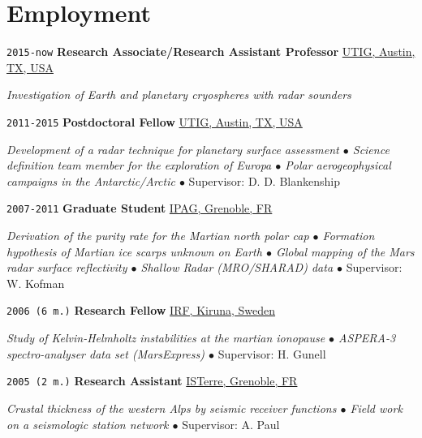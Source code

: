 
\section*{Employment}

\TabPositions{7em,32em}

\noindent \texttt{2015-now} \tab \textbf{Research Associate/Research Assistant Professor} \tab
\href{https://www.ig.utexas.edu/}{UTIG, Austin, TX, USA}
\begin{adjustwidth}{7em}{}
\textit{Investigation of Earth and planetary cryospheres with radar sounders}
\end{adjustwidth}
\vspace{.5em}

\noindent \texttt{2011-2015} \tab \textbf{Postdoctoral Fellow} \tab
\href{https://www.ig.utexas.edu/}{UTIG, Austin, TX, USA}
\begin{adjustwidth}{7em}{}
\textit{Development of a radar technique for planetary surface assessment $\bullet$ Science definition team member for the exploration of Europa $\bullet$ Polar aerogeophysical campaigns in the Antarctic/Arctic $\bullet$} Supervisor: D. D. Blankenship
\end{adjustwidth}
\vspace{.5em}

\noindent \texttt{2007-2011} \tab \textbf{Graduate Student} \tab
\href{http://ipag.osug.fr/}{IPAG, Grenoble, FR}
\vspace{.3em}
\begin{adjustwidth}{7em}{}
\textit{Derivation of the purity rate for the Martian north polar cap $\bullet$ Formation hypothesis of Martian ice scarps unknown on Earth $\bullet$ Global mapping of the Mars radar surface reflectivity $\bullet$ Shallow Radar (MRO/SHARAD) data $\bullet$} Supervisor: W. Kofman
\end{adjustwidth}
\vspace{.5em}

\noindent \texttt{2006 (6 m.)} \tab \textbf{Research Fellow} \tab
\href{https://www2.irf.se/}{IRF, Kiruna, Sweden}
\vspace{.3em}
\begin{adjustwidth}{7em}{}
\textit{Study of Kelvin-Helmholtz instabilities at the martian ionopause $\bullet$ ASPERA-3 spectro-analyser data set (MarsExpress) $\bullet$} Supervisor: H. Gunell
\end{adjustwidth}
\vspace{.5em}

\noindent \texttt{2005 (2 m.)} \tab \textbf{Research Assistant} \tab
\href{https://www.isterre.fr/}{ISTerre, Grenoble, FR}
\vspace{.3em}
\begin{adjustwidth}{7em}{}
\textit{Crustal thickness of the western Alps by seismic receiver functions $\bullet$ Field work on a seismologic station network $\bullet$} Supervisor: A. Paul
\end{adjustwidth}
\vspace{.5em}

